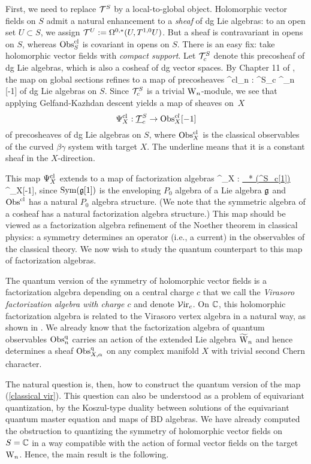 First, we need to replace $\mathcal T^S$ by a local-to-global object.
Holomorphic vector fields on $S$ admit a natural enhancement to a {\em sheaf} of dg Lie algebras: to an open set $U \subset S$, we assign $\mathcal T^U := \Omega^{0,*}(U, T^{1,0}U)$.
But a sheaf is contravariant in opens on $S$, whereas ${\rm Obs}^{{\rm cl}}_S$ is covariant in opens on $S$.
There is an easy fix: take holomorphic vector fields with {\em compact support}.
Let $\mathcal T^S_c$ denote this precosheaf of dg Lie algebras, which is also a cosheaf of dg vector spaces. 
By Chapter 11 of \cite{CG}, the map on global sections refines to a map of precosheaves 
\ben
\Psi^{\rm cl}_n : \cT^S_c \to \Obs^{\cl}_n [-1] 
\een
of dg Lie algebras on $S$.
Since $\mathcal T^S_c$ is a trivial ${{\rm W}_n}$-module, we see that applying Gelfand-Kazhdan descent yields a map of sheaves on~$X$
\[
\Psi^{{\rm cl}}_X : {\underline {\mathcal T}^S_c} \to {\rm Obs}^{cl}_X[-1]
\]
of precosheaves of dg Lie algebras on $S$, where ${\rm Obs}^{{\rm cl}}_X$ is the classical observables of the curved $\beta\gamma$ system with target $X$. The underline means that it is a constant sheaf in the $X$-direction. 

This map $\Psi^{{\rm cl}}_X$ extends to a map of factorization algebras
\be\label{classical vir}
\Psi^{\cl}_X : \ul{\Sym_* (\cT^S_c[1])} \to \Obs^{\cl}_X[-1], 
\ee 
since ${\rm Sym}(\mathfrak g[1])$ is the enveloping $P_0$ algebra of a Lie algebra $\mathfrak g$ and ${\rm Obs}^{{\rm cl}}$ has a natural $P_0$ algebra structure.
(We note that the symmetric algebra of a cosheaf has a natural factorization algebra structure.)
This map should be viewed as a factorization algebra refinement of the Noether theorem in classical physics: a symmetry determines an operator (i.e., a current) in the observables of the classical theory. 
We now wish to study the quantum counterpart to this map of factorization algebras. 

The quantum version of the symmetry of holomorphic vector fields is a factorization algebra depending on a central charge $c$ that we call the {\em Virasoro factorization algebra with charge $c$} and denote $\mathcal{V}{\rm ir}_{c}$. On $\mathbb C$, this holomorphic factorization algebra is related to the Virasoro vertex algebra in a natural way, as shown in \cite{bw_vir}. 
We already know that the factorization algebra of quantum observables ${\rm Obs}^{{\rm q}}_n$ carries an action of the extended Lie algebra $\widetilde{{{\rm W}}}_n$ and hence determines a sheaf ${\rm Obs}^{{\rm q}}_{X,\alpha}$ on any complex manifold $X$ with trivial second Chern character. 

The natural question is, then, how to construct the quantum version of the map (\ref{classical vir}). This question can also be understood as a problem of equivariant quantization, by the Koszul-type duality between solutions of the equivariant quantum master equation and maps of BD algebras. We have already computed the obstruction to quantizing the symmetry of holomorphic vector fields on $S = \mathbb C$ in a way compatible with the action of formal vector fields on the target ${{\rm W}_n}$. Hence, the main result is the following.

